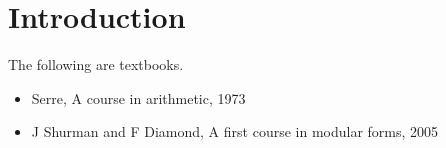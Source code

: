\def\module{M4P58 Modular Forms}
\def\lecturer{Dr David Helm}
\def\term{Autumn 2019}
\def\cover{}
\def\syllabus{}
\def\thm{subsection}







\section{Introduction}


The following are textbooks.
\begin{itemize}
\item Serre, A course in arithmetic, 1973
\item J Shurman and F Diamond, A first course in modular forms, 2005
\end{itemize}

